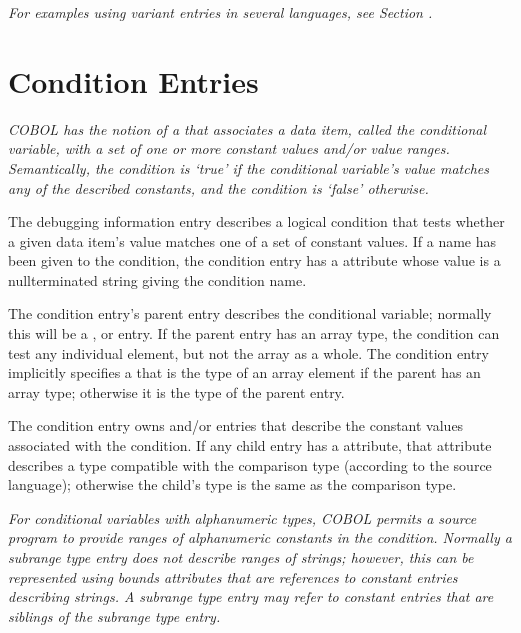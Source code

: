 \bb
\textit{For examples using variant entries in several languages,
see Section .}
\eb

\section{Condition Entries}
\label{chap:conditionentries}

\textit{COBOL has the notion of
a  that
associates a data item, called the conditional variable, with
a set of one or more constant values and/or value ranges.
Semantically, the condition is \textquoteleft true\textquoteright{}
if the conditional
variable's value matches any of the described constants,
and the condition is \textquoteleft false\textquoteright{} otherwise.}

The \DWTAGconditionTARG{}
debugging information entry
describes a
logical condition that tests whether a given data item\textquoteright s
value matches one of a set of constant values. If a name
has been given to the condition, the condition entry has a
\DWATname{} attribute
whose value is a null\dash terminated string
giving the condition name.

The condition entry's parent entry describes the conditional
variable; normally this will be a \DWTAGvariable,
\DWTAGmember{} or
\DWTAGformalparameter{} entry.
If
the parent
entry has an array type, the condition can test any individual
element, but not the array as a whole. The condition entry
implicitly specifies a  that is the
type of an array element if the parent has an array type;
otherwise it is the type of the parent entry.

The condition entry owns \DWTAGconstant{} and/or
\DWTAGsubrangetype{} entries that describe the constant
values associated with the condition. If any child entry
has a \DWATtype{} attribute, that attribute describes
a type compatible with the comparison type (according to the
source language); otherwise the child\textquoteright{}s type
is the same as the comparison type.

\textit{For conditional variables with alphanumeric types, COBOL
permits a source program to provide ranges of alphanumeric
constants in the condition. Normally a subrange type entry
does not describe ranges of strings; however, this can be
represented using bounds attributes that are references to
constant entries describing strings. A subrange type entry may
refer to constant entries that are siblings of the subrange
type entry.}


